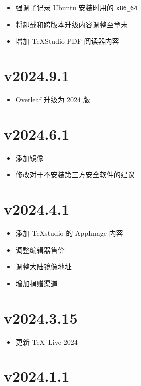\begin{itemize}
  \item 强调了记录 Ubuntu 安装时用的 \texttt{x86\_64}
  \item 将卸载和跨版本升级内容调整至章末
  \item 增加 \TeX Studio PDF 阅读器内容
\end{itemize}

\section*{v2024.9.1}

\begin{itemize}
  \item Overleaf 升级为 2024 版
\end{itemize}

\section*{v2024.6.1}

\begin{itemize}
  \item 添加镜像
  \item 修改对于不安装第三方安全软件的建议
\end{itemize}

\section*{v2024.4.1}

\begin{itemize}
  \item 添加 \TeX studio 的 AppImage 内容
  \item 调整编辑器售价
  \item 调整大陆镜像地址
  \item 增加捐赠渠道
\end{itemize}

\section*{v2024.3.15}

\begin{itemize}
  \item 更新 \TeX\ Live 2024
\end{itemize}

\section*{v2024.1.1}

